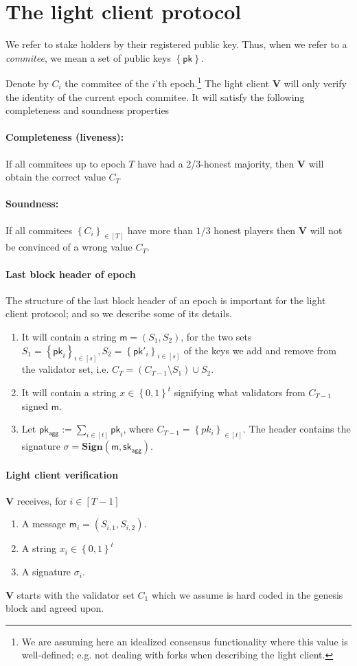 \documentclass[11pt]{article}
\numberwithin{figure}{section} %
\newcommand{\set}[1]{\ensuremath{\left\{#1\right\}}\xspace}
\newcommand{\defeq}{:=}
\newcommand{\B}{\ensuremath{\set{0,1}}\xspace}
\newcommand{\sett}[2]{\ensuremath{\set{#1}_{#2}}\xspace}
\newcommand{\msg}{\ensuremath{\mathsf{m}}\xspace}
\newcommand{\pk}{\ensuremath{\mathsf{pk}}\xspace}
\newcommand{\pkagg}{\ensuremath{\mathsf{pk_{agg}}}\xspace}
\newcommand{\skagg}{\ensuremath{\mathsf{sk_{agg}}}\xspace}
\newcommand{\sign}{\ensuremath{\mathbf{Sign}}\xspace}
\newcommand{\ver}{\ensuremath{\mathsf{\mathbf{V}}}\xspace}
\newcommand{\sig}{\ensuremath{\sigma}\xspace}
\begin{document}
\section{The light client protocol}
We refer to stake holders by their registered public key.
Thus, when we refer to a \emph{commitee}, we mean a set of public keys \set{\pk}.




Denote by $C_i$ the commitee of the $i$'th epoch.\footnote{We are assuming here an idealized consensus functionality where this value is well-defined; e.g. not dealing with forks when describing the light client.}
The light client \ver will only verify the identity of the current epoch commitee.
It will satisfy the following completeness and soundness properties

\paragraph{Completeness (liveness):}
If all commitees up to epoch $T$ have had a 2/3-honest majority, then
\ver will obtain the correct value $C_T$
\paragraph{Soundness:} If all commitees $\sett{C_i}{\in [T]}$ have more than $1/3$ honest players then \ver will not be convinced of a wrong value $C_T$.

\paragraph{Last block header of epoch}
The structure of the last block header of an epoch is important for the light client protocol;
and so we describe some of its details.
\begin{enumerate}
 \item It will contain a string $\msg = (S_1,S_2)$, for the two sets $S_1=\sett{\pk_i}{i\in [s]},S_2=\sett{\pk'_i}{i\in [s]}$ of the keys we add and remove from the validator set, i.e. $C_{T} = (C_{T-1}\setminus S_1)\cup S_2$.
 \item It will contain a string $x\in \B^t$ signifying what validators from $C_{T-1}$ signed \msg.
 \item Let $\pkagg \defeq \sum_{i\in [t]} \pk_i$, where $C_{T-1} = \sett{pk_i}{\in [t]}$.
 The header contains the signature $\sig = \sign(\msg,\skagg)$.
 \end{enumerate}

\paragraph{Light client verification}
\ver receives, for $i\in [T-1]$
\begin{enumerate}
 \item A message $\msg_i =(S_{i,1},S_{i,2})$.
 \item A string $x_i\in \B^t$
 \item A signature $\sig_i$.
\end{enumerate}
\ver starts with the validator set $C_1$ which we assume is hard coded in the genesis block and agreed upon.
\end{document}
